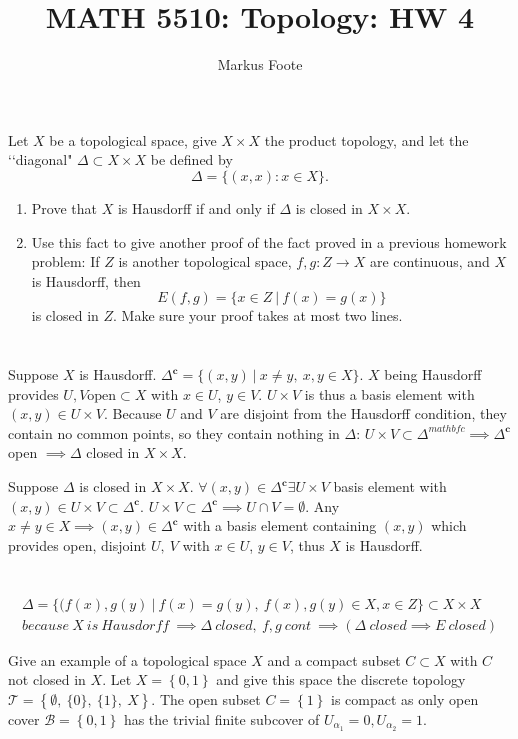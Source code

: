 \documentclass{jhwhw}
\title{MATH 5510: Topology: HW 4}
\author{Markus Foote}
\newcommand{\T}{{\mathcal T}}
\newcommand{\B}{{\mathcal B}}
\begin{document}
\problem{}%
Let $X$ be a topological space, give $X\times X$ the product topology, and let the \lq\lq diagonal"  $\Delta\subset X\times X$ be defined by 
$$
\Delta =\{ (x,x): x\in X\}.
$$
\begin{enumerate}
	
	\item Prove that $X$ is Hausdorff if and only if $\Delta$ is closed in $X\times X$.
	
	\item Use this fact to give another proof of the fact proved in a previous homework problem:  If $Z$ is another topological space, $f,g:Z\to X$ are continuous, and $X$ is Hausdorff, then
	$$
	E(f,g) = \{x\in Z \ | \ f(x) = g(x)\}
	$$ 
	is closed in $Z$.  Make sure your proof takes at most two lines.
\end{enumerate}
\solution{}
\part{}
Suppose $X$ is Hausdorff. $\Delta^{\mathbf{c}}=\{(x,y)\ | \ x\ne y,\ x,y\in X\}$. $X$ being Hausdorff provides $U,V \mathrm{ open }\subset X$ with $x\in U$, $y\in V$. $U\times V$ is thus a basis element with $(x,y) \in U\times V$. Because $U$ and $V$ are disjoint from the Hausdorff condition, they contain no common points, so they contain nothing in $\Delta$: $U\times V \subset \Delta^{mathbf{c}}\implies \Delta^{\mathbf{c}}$ open $\implies \Delta$ closed in $X\times X$.

Suppose $\Delta$ is closed in $X\times X$. $\forall (x,y)\in \Delta^{\mathbf{c}} \exists U\times V$ basis element with $(x,y)\in U\times V \subset \Delta^{\mathbf{c}}$. $U\times V \subset \Delta^{\mathbf{c}} \implies U\cap V=\emptyset$. Any $x\ne y\in X \implies (x,y)\in \Delta^{\mathbf{c}}$ with a basis element containing $(x,y)$ which provides open, disjoint $U,\ V$ with $x\in U$, $y\in V$, thus $X$ is Hausdorff.


\part{}
\begin{gather}
\Delta = \{(f(x),g(y)\ | \ f(x) = g(y),\ f(x),g(y) \in X, x \in Z\} \subset X \times X\\
because \ X \ is \ {Hausdorff} \ \implies \Delta \ closed, \ f,g \ cont \ \implies \left( \Delta \ closed \implies E \ closed \right)
\end{gather}


\problem{} %
Give an example of a topological space $X$ and a compact subset $C\subset X$ with $C$ not closed in $X$.
\solution{}
Let $X=\left\{ 0,1\right\}$ and give this space the discrete topology $\T=\left\{ \emptyset,\ \{0\},\ \{1\},\ X\right\}$. The open subset $C=\left\{ 1\right\}$ is compact as only open cover $\B =\left\{0,1\right\}$ has the trivial finite subcover of $U_{\alpha_1}=0, U_{\alpha_2}=1$. 
\end{document}
